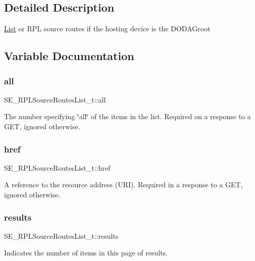 \subsection{Detailed Description}
\hyperlink{structList}{List} or R\+PL source routes if the hosting device is the D\+O\+D\+A\+Groot 

\subsection{Variable Documentation}
\mbox{\label{group__RPLSourceRoutesList_ga04c0efe18f093f5ff2a5e67a613c54f7}} 
\subsubsection{\texorpdfstring{all}{all}}
{\footnotesize\ttfamily S\+E\+\_\+\+R\+P\+L\+Source\+Routes\+List\+\_\+t\+::all}

The number specifying \char`\"{}all\char`\"{} of the items in the list. Required on a response to a G\+ET, ignored otherwise. \mbox{\label{group__RPLSourceRoutesList_gaf65b4ffd48968f3035c0e40b241a43f4}} 
\subsubsection{\texorpdfstring{href}{href}}
{\footnotesize\ttfamily S\+E\+\_\+\+R\+P\+L\+Source\+Routes\+List\+\_\+t\+::href}

A reference to the resource address (U\+RI). Required in a response to a G\+ET, ignored otherwise. \mbox{\label{group__RPLSourceRoutesList_ga1c13d6ce2b9941d34c0562011bae9012}} 
\subsubsection{\texorpdfstring{results}{results}}
{\footnotesize\ttfamily S\+E\+\_\+\+R\+P\+L\+Source\+Routes\+List\+\_\+t\+::results}

Indicates the number of items in this page of results. 